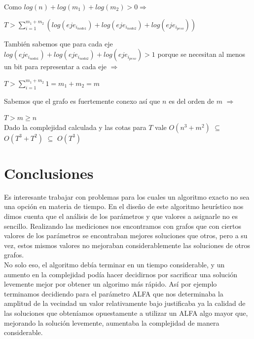 \documentclass[11pt, a4paper, spanish]{article}
\begin{document}
	\noindent Como $log(n) + log(m_{1}) + log(m_{2}) > 0 \Rightarrow$
	\begin{center}
	$T > \displaystyle\sum_{i=1}^{m_{1} + m_{2}}{(log(eje_{i_{nodo1}})+log(eje_{i_{nodo2}}) + log(eje_{i_{peso}}))}$\\
	\end{center}

	\noindent Tambi\'en sabemos que para cada eje $log(eje_{i_{nodo1}})+log(eje_{i_{nodo2}}) + log(eje_{i_{peso}}) > 1$ porque se necesitan al menos un bit para representar a cada eje $\Rightarrow$\\
	\begin{center}
	$T > \displaystyle\sum_{i=1}^{m_{1} + m_{2}}{1} = m_{1} + m_{2} = m$ \\
	\end{center}
	Sabemos que el grafo es fuertemente conexo as\'i que $n$ es del orden de $m$ $\Rightarrow$

	\begin{center}
	$T > m \geq n$ \\
	Dado la complejidad calculada y las cotas para $T$ vale $O(n^{3} + m^{2})$ $\subseteq$ $O(T^{3}+T^{2})$ $\subseteq$ $O(T^{3})$
	\end{center}
\newpage


\section{Conclusiones}

	Es interesante trabajar con problemas para los cuales un algoritmo exacto no sea una opci\'on en materia de tiempo. En el dise\~{n}o de este algoritmo heur\'istico nos dimos cuenta que el an\'alisis de los par\'ametros y que valores a asignarle no es sencillo. Realizando las mediciones nos encontramos con grafos que con ciertos valores de los par\'ametros se encontraban mejores soluciones que otros, pero a su vez, estos mismos valores no mejoraban considerablemente las soluciones de otros grafos.\\

No solo eso, el algoritmo deb\'ia terminar en un tiempo considerable, y un aumento en la complejidad pod\'ia hacer decidirnos por sacrificar una soluci\'on levemente mejor por obtener un algorimo m\'as r\'apido. As\'i por ejemplo terminamos decidiendo para el par\'ametro ALFA que nos determinaba la amplitud de la vecindad un valor relativamente bajo justificaba ya la calidad de las soluciones que obten\'iamos opuestamente a utilizar un ALFA algo mayor que, mejorando la soluci\'on levemente, aumentaba la complejidad de manera considerable.\\
\end{document}
